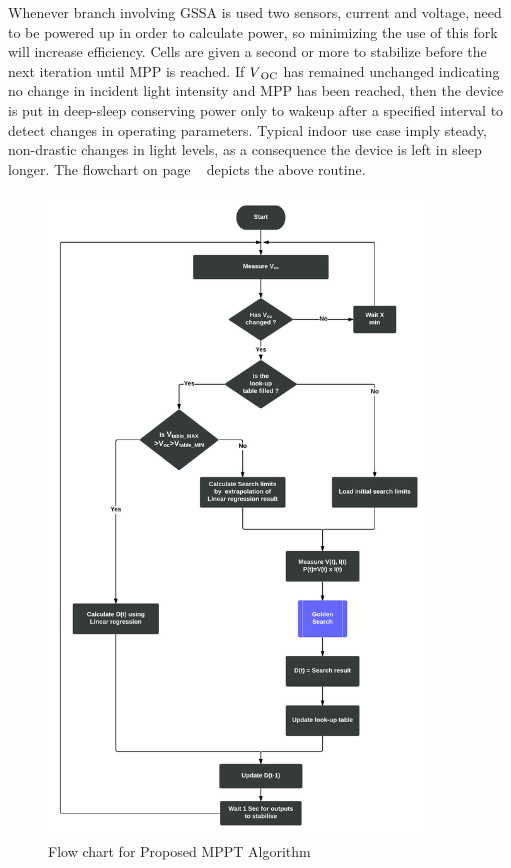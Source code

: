 Whenever branch involving \ac{GSSA} is used two sensors, current and voltage, need to be powered up in order to calculate power, so minimizing the use of this fork will increase efficiency. Cells are given a second or more to stabilize before the next iteration until \ac{MPP} is reached. If $V\textsubscript{OC}$ has remained unchanged indicating no change in incident light intensity and \ac{MPP} has been reached, then the device is put in deep-sleep conserving power only to wakeup after a specified interval to detect changes in operating parameters. Typical indoor use case imply steady, non-drastic changes in light levels, as a consequence the device is left in sleep longer. The flowchart on page ~\pageref{fig:cyflow} depicts the above routine.\\
                    
           
  \begin{figure}[H]
    \begin{center}
	   \includegraphics[width=0.9\textwidth]{images/Proposed_Flow}
	   \caption{ Flow chart for Proposed MPPT Algorithm }
	   \label{fig:cyflow}
    \end{center}
  \end{figure}





